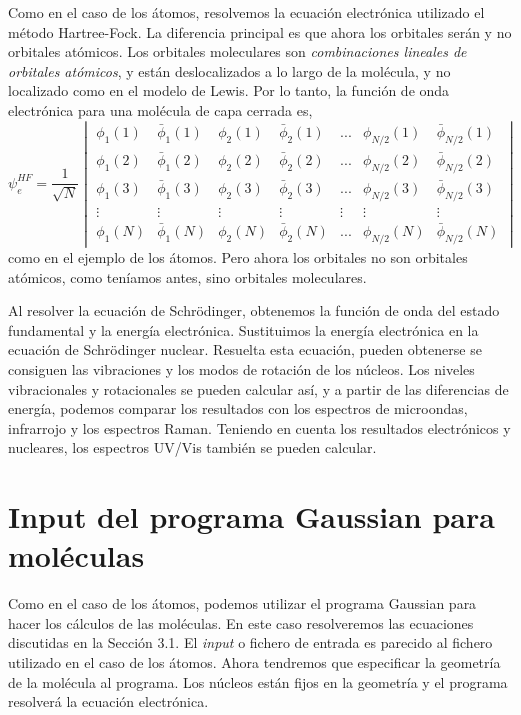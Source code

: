 \documentclass{tufte-book}
\begin{document}
Como en el caso de los átomos, resolvemos la ecuación electrónica 
utilizado el método Hartree-Fock. La diferencia principal es que 
ahora los orbitales serán  y no 
orbitales atómicos. Los orbitales moleculares son \textit{
combinaciones lineales de orbitales atómicos}, y están
deslocalizados a lo largo de la molécula, y no localizado como en
el modelo de Lewis. Por lo tanto, la función de onda electrónica
para una molécula de capa cerrada es,
\begin{equation}
    \psi_e^{HF}=\frac{1}{\sqrt{N}} 
    \begin{vmatrix}
    \phi_1(1) & \bar{\phi}_1(1) & \phi_2(1) & \bar{\phi}_2(1)& ...& \phi_{N/2}(1) & \bar{\phi}_{N/2}(1)\\ 
    \phi_1(2) & \bar{\phi}_1(2) & \phi_2(2) & \bar{\phi}_2(2)& ...& \phi_{N/2}(2) & \bar{\phi}_{N/2}(2) \\
    \phi_1(3) & \bar{\phi}_1(3) & \phi_2(3) & \bar{\phi}_2(3)& ...& \phi_{N/2}(3) & \bar{\phi}_{N/2}(3) \\
    \vdots & \vdots &\vdots &\vdots &\vdots &\vdots &\vdots \\
    \phi_1(N) & \bar{\phi}_1(N) & \phi_2(N) & \bar{\phi}_2(N)& ...& \phi_{N/2}(N) & \bar{\phi}_{N/2}(N)
    \end{vmatrix}
\end{equation}
como en el ejemplo de los átomos. Pero ahora los orbitales no son orbitales atómicos, como teníamos antes, sino orbitales moleculares. 

Al resolver la ecuación de Schrödinger, obtenemos la función de
onda del estado fundamental y la energía electrónica. Sustituimos
la energía electrónica en la ecuación de Schrödinger nuclear. 
Resuelta esta ecuación, pueden obtenerse se consiguen las
vibraciones y los modos de rotación de los núcleos. Los niveles
vibracionales y rotacionales se pueden calcular así, y a partir de 
las diferencias de energía, podemos comparar los resultados con los
espectros de microondas, infrarrojo y los espectros Raman. 
Teniendo en cuenta los resultados electrónicos y nucleares, los
espectros UV/Vis también se pueden calcular.

\section{Input del programa Gaussian para moléculas}
Como en el caso de los átomos, podemos utilizar el programa
Gaussian para hacer los cálculos de las moléculas. En este
caso resolveremos las ecuaciones discutidas en la Sección 3.1. 
El \textit{input} o fichero de entrada es parecido al fichero
utilizado en el caso de los átomos. Ahora tendremos que 
especificar la geometría de la molécula al programa. Los núcleos
están fijos en la geometría y el programa resolverá la ecuación
electrónica.
\end{document}
